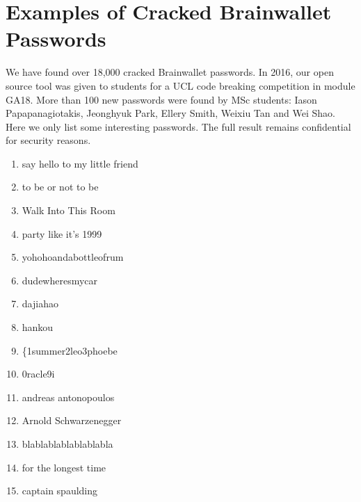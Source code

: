 \chapter{Examples of Cracked Brainwallet Passwords}
\label{appendixlabel2}
We have found over 18,000 cracked Brainwallet passwords. In 2016, our open source tool was given to students for a UCL code breaking competition in module GA18. More than 100 new passwords were found by MSc students: Iason Papapanagiotakis, Jeonghyuk Park, Ellery Smith, Weixiu Tan and Wei Shao. Here we only list some interesting passwords. The full result remains confidential for security reasons. 
\begin{enumerate}
	\item say hello to my little friend
	\item to be or not to be
	\item Walk Into This Room
	\item party like it's 1999
	\item yohohoandabottleofrum
	\item dudewheresmycar
	\item dajiahao
	\item hankou
	\item \{1summer2leo3phoebe
	\item 0racle9i
	\item andreas antonopoulos
	\item Arnold Schwarzenegger
	\item blablablablablablabla
	\item for the longest time
	\item captain spaulding
\end{enumerate}



